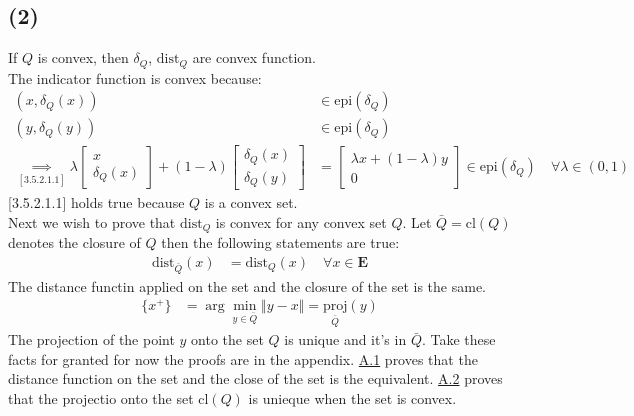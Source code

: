 \documentclass[]{article}
\begin{document}
    \subsection*{(2)}
        If $Q$ is convex, then $\delta_Q$, $\text{dist}_Q$ are convex function. 
        \\[1.1em]
        The indicator function is convex because: 
        \begin{align*}\tag{3.5.2.1}\label{eqn:3.5.2.1}
            (x, \delta_Q(x))&\in \text{epi}(\delta_Q) 
            \\
            (y, \delta_Q(y)) & \in \text{epi}(\delta_Q)
            \\ \underset{[3.5.2.1.1]}{\implies}
            \lambda \begin{bmatrix}
                x \\ \delta_Q(x) 
            \end{bmatrix} + 
            (1 - \lambda) \begin{bmatrix}
                \delta_Q(x)  \\ \delta_Q(y)
            \end{bmatrix} & 
            = \begin{bmatrix}
                \lambda x + (1 - \lambda) y
                \\
                0
            \end{bmatrix} \in \text{epi}(\delta_Q)
            \quad \forall \lambda \in (0, 1)
        \end{align*}
        [3.5.2.1.1] holds true because $Q$ is a convex set.
        \\
        Next we wish to prove that $\text{dist}_Q$ is convex for any convex set $Q$. Let $\bar{Q} = \text{cl}(Q)$ denotes the closure of $Q$ then the following statements are true: 
        \begin{align*}\tag{3.5.2.2}\label{eqn:3.5.2.2}
            \text{dist}_{\bar{Q}}(x) &= \text{dist}_Q(x) \quad \forall x \in \mathbf{E}
        \end{align*}
        The distance functin applied on the set and the closure of the set is the same. 
        \begin{align*}\tag{3.5.2.3}\label{eqn:3.5.2.3}
            \{x^+\} &= \arg\min_{y \in \bar{Q}} \Vert y - x\Vert = \underset{\bar{Q}}{\text{proj}}(y)
        \end{align*}
        The projection of the point $y$ onto the set $Q$ is unique and it's in $\bar{Q}$. Take these facts for granted for now the proofs are in the appendix. \hyperref[sec:A.1]{A.1} proves that the distance function on the set and the close of the set is the equivalent. \hyperref[sec:A.2]{A.2} proves that the projectio onto the set $\text{cl}(Q)$ is unieque when the set is convex.
\end{document}
